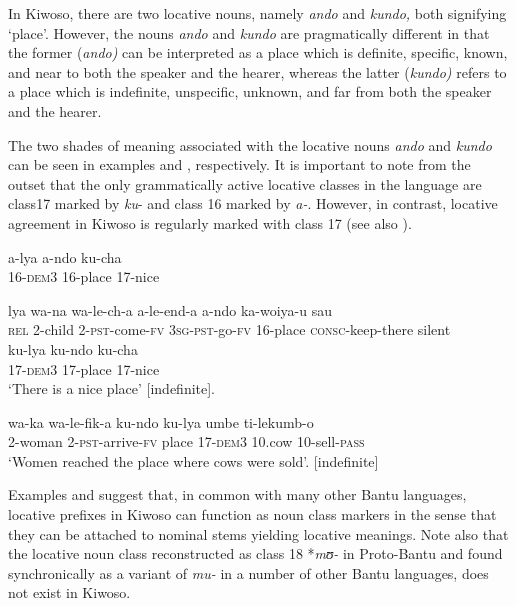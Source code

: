 \documentclass[output=paper]{langscibook}
\begin{document}
In Kiwoso, there are two locative nouns, namely \textit{ando} and \textit{kundo,} both signifying ‘place’. However, the nouns \textit{ando} and \textit{kundo} are pragmatically different in that the former (\textit{ando)} can be interpreted as a place which is definite, specific, known, and near to both the speaker and the hearer, whereas the latter (\textit{kundo)} refers to a place which is indefinite, unspecific, unknown, and far from both the speaker and the hearer.

The two shades of meaning associated with the locative nouns \textit{ando} and \textit{kundo} can be seen in examples  and , respectively. It is important to note from the outset that the only grammatically active locative classes in the language are class17 marked by \textit{ku}{}- and class 16 marked by \textit{a-}. However, in contrast, locative agreement in Kiwoso is regularly marked with class 17 (see also ).

\ea%
    \label{ex:mallya:2}
    \ea\label{ex:mallya:2a}
    \gll a-lya            a-ndo        ku-cha\\
 16-\textsc{dem}3    16-place      17-nice\\
    
    \ex\label{ex:mallya:2b} 
    \gll lya   wa-na   wa-le-ch-a      a-le-end-a    a-ndo      ka-woiya-u      sau\\
    \textsc{rel}  2-child 2-\textsc{pst}-come-\textsc{fv}      3\textsc{sg}-\textsc{pst}-go-\textsc{fv}  16-place  \textsc{consc}-keep-there  silent\\
    \z
\ex\label{ex:mallya:3}
    \ea\label{ex:mallya:3a} 
    \gll ku-lya          ku-ndo    ku-cha\\
      17-\textsc{dem}3  17-place    17-nice\\
    \glt  ‘There is a nice place’ [indefinite].

  \ex\label{ex:mallya:3b}
  \gll wa-ka           wa-le-fik-a   ku-ndo ku-lya       umbe       ti-lekumb-o\\
    2-woman      2-\textsc{pst}-arrive-\textsc{fv} place    17-\textsc{dem}3    10.cow    10-sell-\textsc{pass}\\
    \glt  ‘Women reached the place where cows were sold’. [indefinite]
    \z
\z

Examples  and  suggest that, in common with many other Bantu languages, locative prefixes in Kiwoso can function as noun class markers in the sense that they can be attached to nominal stems yielding locative meanings. Note also that the locative noun class reconstructed as class 18 *\textit{mʊ{}-} in Proto-Bantu and found synchronically as a variant of \textit{mu-} in a number of other Bantu languages, does not exist in Kiwoso.
\end{document}
